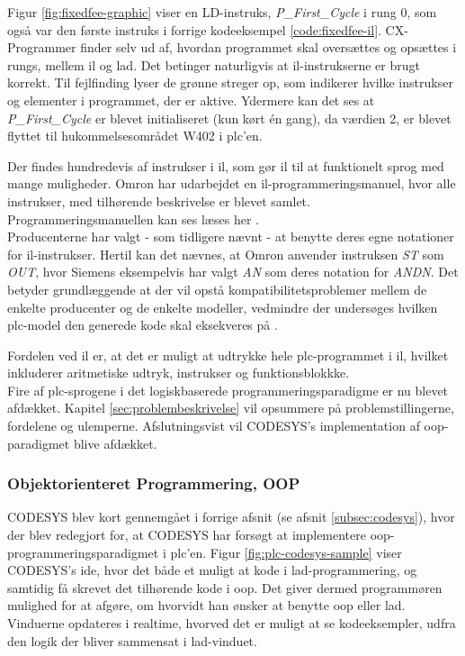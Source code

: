 
\noindent Figur \ref{fig:fixedfee-graphic} viser en LD-instruks, \textit{P\_First\_Cycle} i rung 0, som også var den første instruks i forrige kodeeksempel \ref{code:fixedfee-il}. CX-Programmer finder selv ud af, hvordan programmet skal oversættes og opsættes i rungs, mellem \gls{il} og \gls{lad}. Det betinger naturligvis at \gls{il}-instrukserne er brugt korrekt. 
Til fejlfinding lyser de grønne streger op, som indikerer hvilke instrukser og elementer i programmet, der er aktive. Ydermere kan det ses at \textit{P\_First\_Cycle} er blevet initialiseret (kun kørt én gang), da værdien 2, er blevet flyttet til hukommelsesområdet W402 i \gls{plc}'en.

\noindent Der findes hundredevis af instrukser i \gls{il}, som gør \gls{il} til at funktionelt sprog med mange muligheder. Omron har udarbejdet en \gls{il}-programmeringsmanuel, hvor alle instrukser, med tilhørende beskrivelse er blevet samlet. Programmeringsmanuellen kan ses læses her \cite{omron-il-manuel}. \\ 

\noindent Producenterne har valgt - som tidligere nævnt - at benytte deres egne notationer for \gls{il}-instrukser. Hertil kan det nævnes, at Omron anvender instruksen \textit{ST} som \textit{OUT}, hvor Siemens eksempelvis har valgt \textit{AN} som deres notation for \textit{ANDN}. Det betyder grundlæggende at der vil opstå kompatibilitetsproblemer mellem de enkelte producenter og de enkelte modeller, vedmindre der undersøges hvilken \gls{plc}-model den generede kode skal eksekveres på \cite{FDB_desc}.

\noindent Fordelen ved \gls{il} er, at det er muligt at udtrykke hele \gls{plc}-programmet i \gls{il}, hvilket inkluderer aritmetiske udtryk, instrukser og funktionsblokkke. \\

\noindent Fire af \gls{plc}-sprogene i det logiskbaserede programmeringsparadigme er nu blevet afdækket. Kapitel \ref{sec:problembeskrivelse} vil opsummere på problemstillingerne, fordelene og ulemperne. Afslutningsvist vil CODESYS's implementation af \gls{oop}-paradigmet blive afdækket.

\label{subsec:software_codesys}
\subsubsection{Objektorienteret Programmering, OOP }
\noindent CODESYS blev kort gennemgået i forrige afsnit (se afsnit \ref{subsec:codesys}), hvor der blev redegjort for, at CODESYS har forsøgt at implementere \gls{oop}-programmeringsparadigmet i \gls{plc}'en. Figur \ref{fig:plc-codesys-sample} viser CODESYS's \gls{ide}, hvor det både et muligt at kode i \gls{lad}-programmering, og samtidig få skrevet det tilhørende kode i \gls{oop}. Det giver dermed programmøren mulighed for at afgøre, om hvorvidt han ønsker at benytte \gls{oop} eller \gls{lad}. Vinduerne opdateres i realtime, hvorved det er muligt at se kodeeksempler, udfra den logik der bliver sammensat i \gls{lad}-vinduet. 

